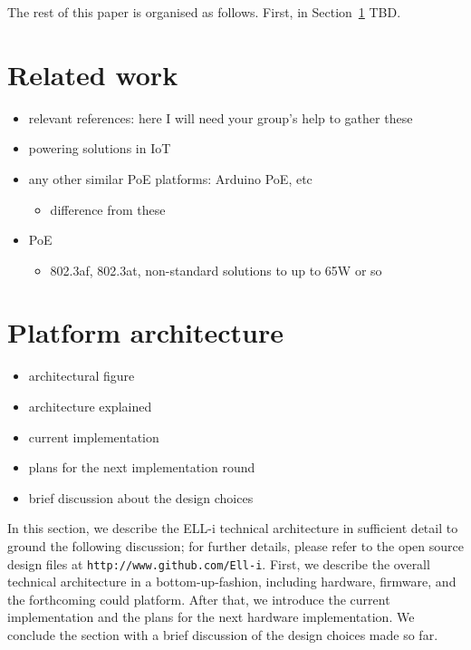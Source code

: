 \documentclass[draft,a4paper]{siamltex}
\begin{document}
The rest of this paper is organised as follows.  First, in
Section~\ref{sec:related} TBD.
 
\section{Related work}
\label{sec:related}

\begin{itemize}
  \item relevant references: here I will need your group's help to gather these
  \item powering solutions in IoT
  \item any other similar PoE platforms: Arduino PoE, etc
    \begin{itemize}
    \item difference from these
    \end{itemize}
  \item PoE
    \begin{itemize}
    \item 802.3af, 802.3at, non-standard solutions to up to 65W or so
    \end{itemize}
\end{itemize}
 
\section{Platform architecture}
\label{sec:architecture}

\begin{itemize}
  \item architectural figure
  \item architecture explained
  \item current implementation
  \item plans for the next implementation round
  \item brief discussion about the design choices
\end{itemize}

In this section, we describe the ELL-i technical architecture in
sufficient detail to ground the following discussion; for further
details, please refer to the open source design files at
\hbox{\tt http://www.github.com/Ell-i}.
First, we describe the overall technical architecture in a
bottom-up-fashion, including hardware, firmware, and the forthcoming
could platform.  After that, we introduce the current
implementation and the plans for the next hardware implementation.  We
conclude the section with a brief discussion of the design choices
made so far.
\end{document}
